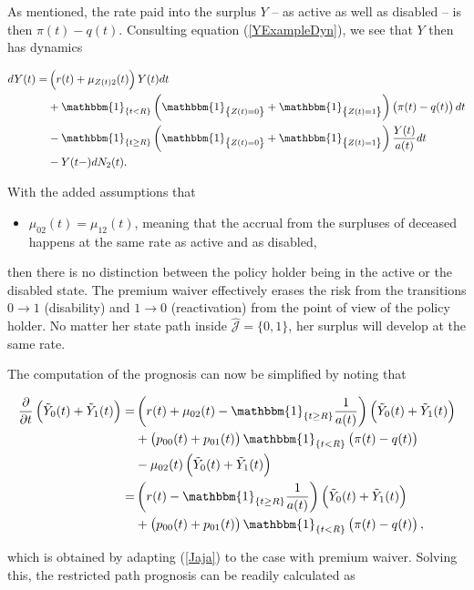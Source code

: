 \documentclass{article}
\newcommand{\1}[1]{\mathbbm{1}_{\left\lbrace #1 \right\rbrace}}
\theoremstyle{break}
\theoremstyle{remark}
\numberwithin{equation}{section}
\begin{document}
As mentioned, the rate paid into the surplus $Y$ -- as active as well as disabled -- is then $\pi(t) - q(t)$. Consulting equation (\ref{YExampleDyn}), we see that $Y$ then has dynamics

\begin{align*}
\begin{split}
	dY(t) =& \left( r(t) + \mu_{Z(t)2}(t) \right) Y(t) dt \\
	&+ \1{t<R} \left( \1{Z(t)=0} + \1{Z(t)=1} \right) \left(\pi(t) - q(t) \right) dt \\
	&- \1{t \geq R} \left( \1{Z(t)=0} + \1{Z(t)=1} \right) \frac{Y(t)}{a(t)} dt \\
	&- Y(t-) dN_2(t).
\end{split}
\end{align*}

With the added assumptions that

\begin{itemize}
	\item $\mu_{02}(t) = \mu_{12}(t)$, meaning that the accrual from the surpluses of deceased happens at the same rate as active and as disabled,
\end{itemize}

then there is no distinction between the policy holder being in the active or the disabled state. The premium waiver effectively erases the risk from the transitions $0 \to 1$ (disability) and $1 \to 0$ (reactivation) from the point of view of the policy holder. No matter her state path inside $\hat{\mathcal{J}} = \{ 0,1 \}$, her surplus will develop at the same rate.

The computation of the prognosis can now be simplified by noting that

\begin{align*}
	\frac{\partial}{\partial t} \left(\tilde{Y}_0(t) + \tilde{Y}_1(t)\right) =& \left( r(t) + \mu_{02}(t) - \1{t \geq R} \frac{1}{a(t)}\right) \left(\tilde{Y}_0(t) + \tilde{Y}_1(t)\right) \\
	&+ \left(p_{00}(t) + p_{01}(t)\right)\1{t<R}\left(\pi(t) - q(t)\right) \\
	&- \mu_{02}(t) \left(\tilde{Y}_0(t) + \tilde{Y}_1(t)\right) \\
	=& \left( r(t) - \1{t \geq R} \frac{1}{a(t)}\right) \left(\tilde{Y}_0(t) + \tilde{Y}_1(t)\right) \\
	&+ \left(p_{00}(t) + p_{01}(t)\right)\1{t<R}\left(\pi(t) - q(t)\right),
\end{align*}

which is obtained by adapting (\ref{Jaja}) to the case with premium waiver. Solving this, the restricted path prognosis can be readily calculated as
\end{document}
